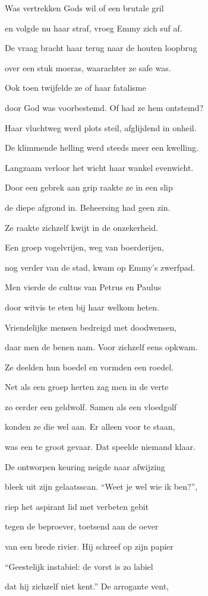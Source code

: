 Was vertrekken Gods wil
of een brutale gril

en volgde nu haar straf,
vroeg Emmy zich suf af.

De vraag bracht haar terug
naar de houten loopbrug

over een stuk moeras,
waarachter ze safe was.

Ook toen twijfelde ze
of haar fatalisme

door God was voorbestemd.
Of had ze hem ontstemd?

Haar vluchtweg werd plots steil,
afglijdend in onheil.

De klimmende helling
werd steeds meer een kwelling.

Langzaam verloor het wicht
haar wankel evenwicht.

Door een gebrek aan grip
raakte ze in een slip

de diepe afgrond in.
Beheersing had geen zin.

Ze raakte zichzelf kwijt
in de onzekerheid.

Een groep vogelvrijen,
weg van boerderijen,

nog verder van de stad,
kwam op Emmy’s zwerfpad.

Men vierde de cultus
van Petrus en Paulus

door witvis te eten
bij haar welkom heten.

Vriendelijke mensen
bedreigd met doodwensen,

daar men de benen nam.
Voor zichzelf eens opkwam.

Ze deelden hun boedel
en vormden een roedel.

Net als een groep herten
zag men in de verte

zo eerder een geldwolf.
Samen als een vloedgolf

konden ze die wel aan.
Er alleen voor te staan,

was een te groot gevaar.
Dat speelde niemand klaar.

De ontworpen keuring
neigde naar afwijzing

bleek uit zijn gelaatsscan.
“Weet je wel wie ik ben?”,

riep het aspirant lid
met verbeten gebit

tegen de beproever,
toetsend aan de oever

van een brede rivier.
Hij schreef op zijn papier

“Geestelijk instabiel:
de vorst is zo labiel

dat hij zichzelf niet kent.”
De arrogante vent,


